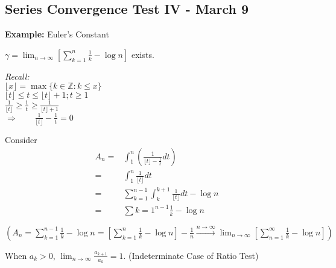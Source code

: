 \documentclass[12pt]{article}
\theoremstyle{plain}
\newcommand{\floor}[1]{\lfloor #1 \rfloor}
\newcommand{\mZ}{{\mathbb{Z}}}
\begin{document}
\subsection{Series Convergence Test IV - March 9}
{\color{Brown}
\textbf{Example:} Euler's Constant

$\gamma = \lim_{n\to\infty} [\sum_{k=1}^n \frac 1k - \log n]$ exists.

\textit{Recall:} \\
$\floor{x} = \max \{k \in \mZ : k \leq x\}$	\\
$\floor{t} \leq t \leq \floor{t} + 1; t \geq 1$\\
$\frac 1{\floor{t}} \geq \frac 1t \geq \frac 1{\floor{t} + 1}$	\\
$\Rightarrow \qquad \frac 1{\floor{t}} - \frac 1t = 0$

Consider 
\begin{align*}
	A_n 
	=& \int_1^n (\frac1{\floor t - \frac 1t} dt)	\\
	=& \int_1^n \frac1{\floor t} dt	\\
	=& \sum_{k=1}^{n-1} \int_k^{k+1} \frac1{\floor t}dt - \log n	\\
	=& \sum{k=1}^{n-1} \frac 1k - \log n	\\\\
\end{align*}
$(A_n = \sum_{k=1}^{n-1} \frac 1k - \log n = 
[\sum_{k=1}^n \frac 1k - \log n] - \frac 1n 
\overset{n\to\infty}{\longrightarrow} \lim_{n\to\infty} 
[\sum_{n=1}^{\infty} \frac 1k - \log n])$

When $a_k > 0$, $\lim_{n\to\infty} \frac{a_{k+1}}{a_k} = 1$. 
(Indeterminate Case of Ratio Test)	\\
}
\end{document}
